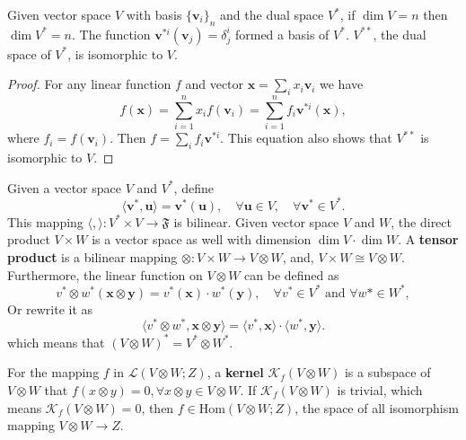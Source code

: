 \begin{theorem}
Given vector space $V$ with basis $\{\boldsymbol{v}_i\}_n$ and the dual space $V^*$, if $\dim V=n$ then $\dim V^*=n$. The function $\boldsymbol{v}^{*i}(\boldsymbol{v}_j)=\delta_j^i$ formed a basis of $V^*$. $V^{**}$, the dual space of $V^*$, is isomorphic to $V$. 
\end{theorem}

\begin{proof}
For any linear function $f$ and vector $\boldsymbol{x}=\sum_ix_i\boldsymbol{v}_i$ we have
\begin{equation}
f(\boldsymbol{x})=\sum_{i=1}^nx_if(\boldsymbol{v}_i)=\sum_{i=1}^nf_i\boldsymbol{v}^{*i}(\boldsymbol{x}),
\end{equation}
where $f_i=f(\boldsymbol{v}_i)$. Then $f=\sum_if_i\boldsymbol{v}^{*i}$. This equation also shows that $V^{**}$ is isomorphic to $V$. 
\end{proof}

\begin{definition}
Given a vector space $V$ and $V^*$, define
\begin{equation}
\langle \boldsymbol{v}^*,\boldsymbol{u}\rangle = \boldsymbol{v}^*(\boldsymbol{u}), \quad \forall \boldsymbol{u}\in V, \quad \forall \boldsymbol{v}^*\in V^*.
\end{equation}
This mapping $\langle,\rangle:V^*\times V\to\mathfrak{F}$ is bilinear. Given vector space $V$ and $W$, the direct product $V\times W$ is a vector space as well with dimension $\dim V\cdot\dim W$. A \textbf{tensor product} is a bilinear mapping $\otimes:V\times W\to V\otimes W$, and, $V\times W\cong V\otimes W$. Furthermore, the linear function on $V\otimes W$ can be defined as
\begin{equation}
v^*\otimes w^*(\boldsymbol{x}\otimes\boldsymbol{y})=v^*(\boldsymbol{x})\cdot w^*(\boldsymbol{y}),\quad \forall v^*\in V^*\,\,\text{and}\,\,\forall w* \in W^*,
\end{equation}
Or rewrite it as
\begin{equation}
\langle v^*\otimes w^*,\boldsymbol{x}\otimes\boldsymbol{y}\rangle=\langle v^*,\boldsymbol{x}\rangle\cdot\langle w^*,\boldsymbol{y}\rangle.
\end{equation}
which means that $(V\otimes W)^*=V^*\otimes W^*$.

For the mapping $f$ in $\mathcal{L}(V\otimes W;Z)$, a \textbf{kernel} $\mathcal{K}_f(V\otimes W)$ is a subspace of $V\otimes W$ that $f(x\otimes y)=0,\forall x\otimes y \in V\otimes W$. If $\mathcal{K}_f(V\otimes W)$ is trivial, which means $\mathcal{K}_f(V\otimes W)=0$, then $f\in\mathrm{Hom}(V\otimes W;Z)$, the space of all isomorphism mapping $V\otimes W\to Z$.
\end{definition}

